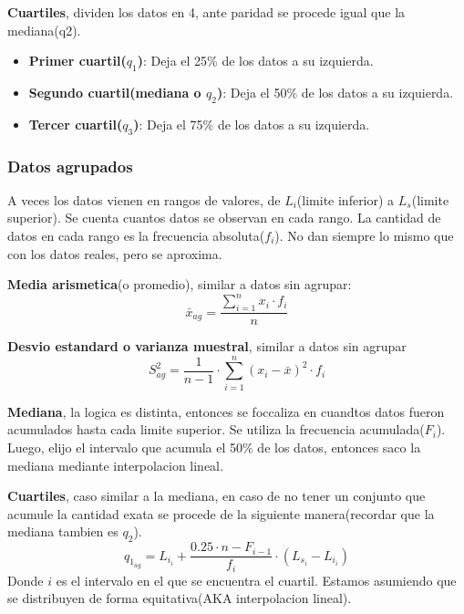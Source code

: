 \begin{definition}
	\textbf{Cuartiles}, dividen los datos en 4, ante paridad se procede igual que la mediana(q2).
	\begin{itemize}
		\item \textbf{Primer cuartil($q_1$)}: Deja el 25\% de los datos a su izquierda.
		\item \textbf{Segundo cuartil(mediana o $q_2$)}: Deja el 50\% de los datos a su izquierda. 
		\item \textbf{Tercer cuartil($q_3$)}: Deja el 75\% de los datos a su izquierda. 
	\end{itemize}
\end{definition}

\subsubsection{Datos agrupados}
A veces los datos vienen en rangos de valores, de $L_i$(limite inferior) a $L_s$(limite superior). 
Se cuenta cuantos datos se observan en cada rango. La cantidad de datos en cada rango es la frecuencia absoluta($f_i$). 
No dan siempre lo mismo que con los datos reales, pero se aproxima.

\begin{definition}
	\textbf{Media arismetica}(o promedio), similar a datos sin agrupar:
	\[
		\bar{x}_{ag}= \frac{\sum_{i=1}^n x_i \cdot f_i}{n}
	\]
\end{definition}

\begin{definition}
	\textbf{Desvio estandard o varianza muestral}, similar a datos sin agrupar 
	\[
		S_{ag}^2 = \frac{1}{n-1} \cdot \sum_{i=1}^n (x_i - \bar{x})^2 \cdot f_i
	\]

\end{definition}

\begin{definition}
	\textbf{Mediana}, la logica es distinta, entonces se foccaliza en cuandtos datos fueron acumulados hasta cada limite superior. Se utiliza la frecuencia acumulada($F_i$). 
	Luego, elijo el intervalo que acumula el 50\% de los datos, entonces saco la mediana mediante interpolacion lineal.
\end{definition}

\begin{definition}
	\textbf{Cuartiles}, caso similar a la mediana, en caso de no tener un conjunto que acumule la cantidad exata se procede de la siguiente manera(recordar que la mediana tambien es $q_2$).
	\[
		q_{1_{ag}} = L_{i_i} + \frac{0.25 \cdot n -  F_{i-1}}{f_i} \cdot (L_{s_i} - L_{i_i})
	\]
Donde $i$ es el intervalo en el que se encuentra el cuartil. Estamos asumiendo que se distribuyen de forma equitativa(AKA interpolacion lineal).

\end{definition}

